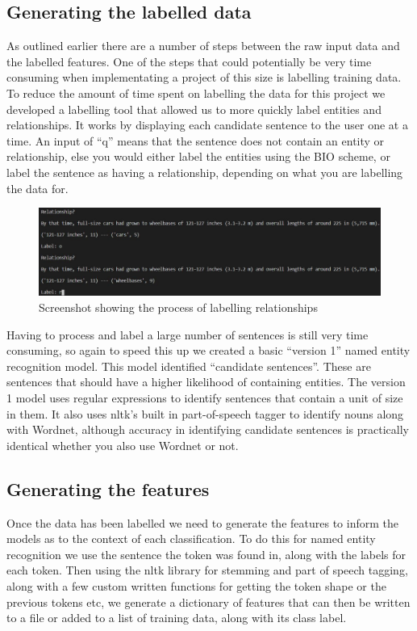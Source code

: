 \documentclass[11pt,oneside]{book}
\begin{document}
\subsection{Generating the labelled data}

As outlined earlier there are a number of steps between the raw input data and the labelled features. One of the steps that could potentially be very time consuming when implementating a project of this size is labelling training data. To reduce the amount of time spent on labelling the data for this project we developed a labelling tool that allowed us to more quickly label entities and relationships. It works by displaying each candidate sentence to the user one at a time. An input of “q” means that the sentence does not contain an entity or relationship, else you would either label the entities using the BIO scheme, or label the sentence as having a relationship, depending on what you are labelling the data for.

\begin{figure}[!htbp]
\centering
\includegraphics[scale=0.5]{images/relationship_labelling_2.jpg}
\caption{Screenshot showing the process of labelling relationships}
\label{img:relationship_labelling}
\end{figure}

Having to process and label a large number of sentences is still very time consuming, so again to speed this up we created a basic “version 1” named entity recognition model. This model identified “candidate sentences”. These are sentences that should have a higher likelihood of containing entities. The version 1 model uses regular expressions to identify sentences that contain a unit of size in them. It also uses nltk's built in part-of-speech tagger to identify nouns along with Wordnet, although accuracy in identifying candidate sentences is practically identical whether you also use Wordnet or not.

\subsection{Generating the features}
Once the data has been labelled we need to generate the features to inform the models as to the context of each classification. To do this for named entity recognition we use the sentence the token was found in, along with the labels for each token. Then using the nltk library for stemming and part of speech tagging, along with a few custom written functions for getting the token shape or the previous tokens etc, we generate a dictionary of features that can then be written to a file or added to a list of training data, along with its class label.
\end{document}
